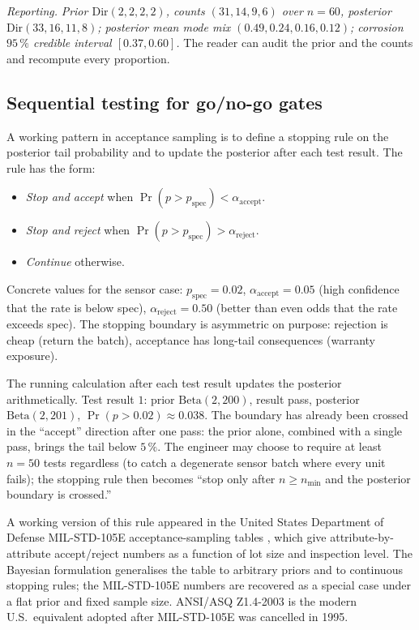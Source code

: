 \textit{Reporting.} \emph{Prior $\text{Dir}(2, 2, 2, 2)$, counts
$(31, 14, 9, 6)$ over $n = 60$, posterior
$\text{Dir}(33, 16, 11, 8)$; posterior mean mode mix
$(0.49, 0.24, 0.16, 0.12)$; corrosion $95 \,\%$ credible interval
$[0.37, 0.60]$.} The reader can audit the prior and the counts and
recompute every proportion.

\subsection{Sequential testing for go/no-go gates}

A working pattern in acceptance sampling is to define a stopping
rule on the posterior tail probability and to update the posterior
after each test result. The rule has the form:

\begin{itemize}[leftmargin=*]
  \item \emph{Stop and accept} when $\Pr(p > p_{\text{spec}}) <
    \alpha_{\text{accept}}$.
  \item \emph{Stop and reject} when $\Pr(p > p_{\text{spec}}) >
    \alpha_{\text{reject}}$.
  \item \emph{Continue} otherwise.
\end{itemize}

Concrete values for the sensor case: $p_{\text{spec}} = 0.02$,
$\alpha_{\text{accept}} = 0.05$ (high confidence that the rate is
below spec), $\alpha_{\text{reject}} = 0.50$ (better than even
odds that the rate exceeds spec). The stopping boundary is
asymmetric on purpose: rejection is cheap (return the batch),
acceptance has long-tail consequences (warranty exposure).

The running calculation after each test result updates the
posterior arithmetically. Test result $1$: prior $\text{Beta}(2,
200)$, result pass, posterior $\text{Beta}(2, 201)$, $\Pr(p >
0.02) \approx 0.038$. The boundary has already been crossed in
the ``accept'' direction after one pass: the prior alone, combined
with a single pass, brings the tail below $5 \,\%$. The engineer
may choose to require at least $n = 50$ tests regardless (to
catch a degenerate sensor batch where every unit fails); the
stopping rule then becomes ``stop only after $n \geq n_{\min}$
and the posterior boundary is crossed.''

A working version of this rule appeared in the United States
Department of Defense MIL-STD-105E acceptance-sampling tables
\cite{std:ch08t3b-mil-std-105e-1989}, which give attribute-by-
attribute accept/reject numbers as a function of lot size and
inspection level. The Bayesian formulation generalises the table
to arbitrary priors and to continuous stopping rules; the
MIL-STD-105E numbers are recovered as a special case under a flat
prior and fixed sample size. ANSI/ASQ Z1.4-2003
\cite{std:ch08t3b-ansi-z1-4-2003} is the modern U.S.\ equivalent
adopted after MIL-STD-105E was cancelled in 1995.

